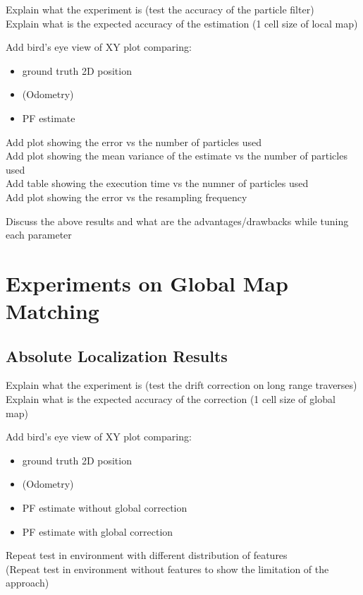 Explain what the experiment is (test the accuracy of the particle filter)\\
Explain what is the expected accuracy of the estimation (1 cell size of local map)

\bigskip
\noindent
Add bird's eye view of XY plot comparing:
\begin{itemize}
    \item ground truth 2D position
    \item (Odometry)
    \item PF estimate
\end{itemize}

\noindent
Add plot showing the error vs the number of particles used\\
Add plot showing the mean variance of the estimate vs the number of particles used\\
Add table showing the execution time vs the numner of particles used\\
Add plot showing the error vs the resampling frequency

\bigskip
\noindent
Discuss the above results and what are the advantages/drawbacks while tuning each parameter

\section{Experiments on Global Map Matching}

\subsection{Absolute Localization Results}

Explain what the experiment is (test the drift correction on long range traverses)\\
Explain what is the expected accuracy of the correction (1 cell size of global map)

\bigskip
\noindent
Add bird's eye view of XY plot comparing:
\begin{itemize}
    \item ground truth 2D position
    \item (Odometry)
    \item PF estimate without global correction
    \item PF estimate with global correction
\end{itemize}

\bigskip
\noindent
Repeat test in environment with different distribution of features\\
(Repeat test in environment without features to show the limitation of the approach)

